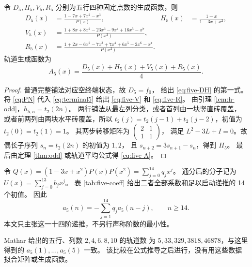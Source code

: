 \begin{theorem}[五行显式公式]\label{thm:five}
令 $D_5,H_5,V_5,R_5$ 分别为五行四种固定点数的生成函数，则
\begin{align}
 D_5(x)&=\frac{1-7x+7x^2-x^3}{P(x)},&
 H_5(x)&=\frac{1-x}{1-3x+x^2},\label{eq:five-DH}\\
 V_5(x)&=\frac{1+8x+8x^2-23x^3-9x^4+16x^5-x^7}{P(x^2)},\label{eq:five-V}\\
 R_5(x)&=\frac{1+2x-6x^2-7x^3+7x^4+6x^5-2x^6-x^7}{P(x^2)}.\label{eq:five-R}
\end{align}
轨道生成函数为
\begin{equation}\label{eq:five-A}
 A_5(x)=\frac{D_5(x)+H_5(x)+V_5(x)+R_5(x)}4.
\end{equation}
\end{theorem}
\begin{proof}
普通完整铺法对应空终端状态，故 $D_5=f_0$，
给出 \eqref{eq:five-DH} 的第一式。
将 \eqref{eq:PN} 代入 \eqref{eq:terminal5} 给出
\eqref{eq:five-V} 和 \eqref{eq:five-R}。
由引理 \ref{lem:h-odd}，$h_{5,n}=t_2(2n)$。
两行铺法从最左列分类，或者首列由一块竖直砖覆盖，
或者前两列由两块水平砖覆盖，所以
$t_2(j)=t_2(j-1)+t_2(j-2)$，初值为 $t_2(0)=t_2(1)=1$。
其两步转移矩阵为
$\left(\begin{smallmatrix}2&1\\1&1\end{smallmatrix}\right)$，
满足 $L^2-3L+I=0$。故偶长子序列 $s_n=t_2(2n)$ 的初值为 $1,2$，
且 $s_{n+2}=3s_{n+1}-s_n$，得到 $H_5$。
最后由定理 \ref{thm:odd} 或轨道平均公式得 \eqref{eq:five-A}。
\end{proof}

令 $Q(x)=(1-3x+x^2)P(x)P(x^2)=\sum_{j=0}^{14}q_jx^j$。
通分后的分子记为 $U(x)=\sum_{j=0}^{13}b_jx^j$。
表 \ref{tab:five-coeff} 给出二者全部系数和足以启动递推的 14 个初值。
因此
\begin{equation}\label{eq:rec5}
 a_5(n)=-\sum_{j=1}^{14}q_j a_5(n-j),\qquad n\ge14.
\end{equation}
本文只主张这一十四阶递推，不另行声称阶数的最小性。



Mathar \cite[表 12]{mathar2013} 给出的五行、列数 $2,4,6,8,10$ 的轨道数
为 $5,33,329,3818,46878$，与这里得到的 $a_5(1),\ldots,a_5(5)$ 一致。
该比较在公式推导之后进行，没有用这些数据拟合矩阵或生成函数。

